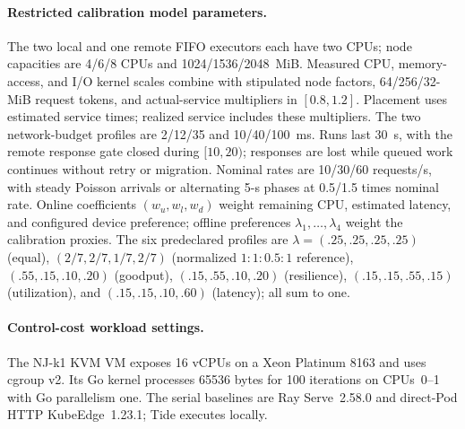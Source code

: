 \paragraph{Restricted calibration model parameters.}
The two local and one remote FIFO executors each have two CPUs; node capacities are 4/6/8 CPUs and 1024/1536/2048~MiB. Measured CPU, memory-access, and I/O kernel scales combine with stipulated node factors, 64/256/32-MiB request tokens, and actual-service multipliers in $[0.8,1.2]$. Placement uses estimated service times; realized service includes these multipliers. The two network-budget profiles are 2/12/35 and 10/40/100~ms. Runs last 30~s, with the remote response gate closed during $[10,20)$; responses are lost while queued work continues without retry or migration. Nominal rates are 10/30/60 requests/s, with steady Poisson arrivals or alternating 5-s phases at 0.5/1.5 times nominal rate. Online coefficients $(w_u,w_l,w_d)$ weight remaining CPU, estimated latency, and configured device preference; offline preferences $\lambda_1,\ldots,\lambda_4$ weight the calibration proxies. The six predeclared profiles are $\lambda=(.25,.25,.25,.25)$ (equal), $(2/7,2/7,1/7,2/7)$ (normalized $1{:}1{:}0.5{:}1$ reference), $(.55,.15,.10,.20)$ (goodput), $(.15,.55,.10,.20)$ (resilience), $(.15,.15,.55,.15)$ (utilization), and $(.15,.15,.10,.60)$ (latency); all sum to one.

\paragraph{Control-cost workload settings.}
The NJ-k1 KVM VM exposes 16 vCPUs on a Xeon Platinum 8163 and uses cgroup v2. Its Go kernel processes 65536 bytes for 100 iterations on CPUs~0--1 with Go parallelism one. The serial baselines are Ray Serve~2.58.0 and direct-Pod HTTP KubeEdge~1.23.1; Tide executes locally.
